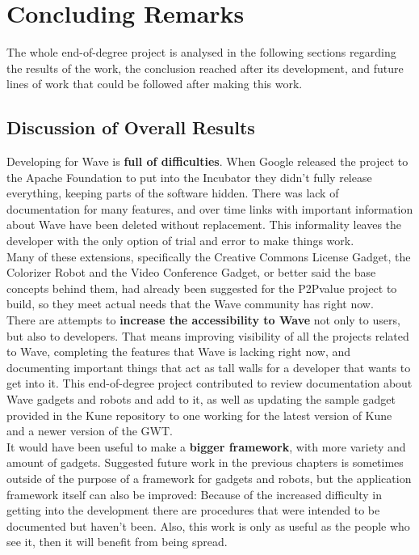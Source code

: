 \chapter{Concluding Remarks}
The whole end-of-degree project is analysed in the following sections regarding the results of the work, the conclusion reached after its development, and future lines of work that could be followed after making this work.
\section{Discussion of Overall Results}
Developing for Wave is \textbf{full of difficulties}. When Google released the project to the Apache Foundation to put into the Incubator they didn't fully release everything, keeping parts of the software hidden. There was lack of documentation for many features, and over time links with important information about Wave have been deleted without replacement. This informality leaves the developer with the only option of trial and error to make things work.\\[.2cm]
Many of these extensions, specifically the Creative Commons License Gadget, the Colorizer Robot and the Video Conference Gadget, or better said the base concepts behind them, had already been suggested for the P2Pvalue project to build, so they meet actual needs that the Wave community has right now.\\[.2cm]
There are attempts to \textbf{increase the accessibility to Wave} not only to users, but also to developers. That means improving visibility of all the projects related to Wave, completing the features that Wave is lacking right now, and documenting important things that act as tall walls for a developer that wants to get into it. This end-of-degree project contributed to review documentation about Wave gadgets and robots and add to it, as well as updating the sample gadget provided in the Kune repository to one working for the latest version of Kune and a newer version of the GWT.\\[.2cm]
It would have been useful to make a \textbf{bigger framework}, with more variety and amount of gadgets. Suggested future work in the previous chapters is sometimes outside of the purpose of a framework for gadgets and robots, but the application framework itself can also be improved: Because of the increased difficulty in getting into the development there are procedures that were intended to be documented but haven't been. Also, this work is only as useful as the people who see it, then it will benefit from being spread.\\[.2cm]
